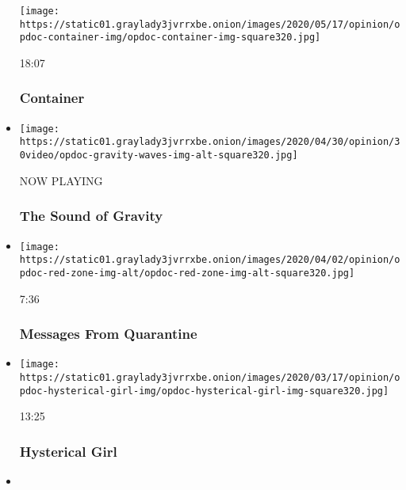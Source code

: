 \begin{itemize}
  \texttt{[image: https://static01.graylady3jvrrxbe.onion/images/2020/05/17/opinion/opdoc-container-img/opdoc-container-img-square320.jpg]}

  18:07

  \hypertarget{container}{%
  \subsubsection{Container}\label{container}}
\item
  \texttt{[image: https://static01.graylady3jvrrxbe.onion/images/2020/04/30/opinion/30video/opdoc-gravity-waves-img-alt-square320.jpg]}

  NOW PLAYING

  \hypertarget{the-sound-of-gravity-2}{%
  \subsubsection{The Sound of Gravity}\label{the-sound-of-gravity-2}}
\item
  \href{https://www.nytimes3xbfgragh.onion/video/opinion/100000007062353/coronavirus-messages-from-quarantine.html?action=click\&module=video-series-bar\&region=header\&pgtype=Article\&playlistId=video/op-docs}{}

  \texttt{[image: https://static01.graylady3jvrrxbe.onion/images/2020/04/02/opinion/opdoc-red-zone-img-alt/opdoc-red-zone-img-alt-square320.jpg]}

  7:36

  \hypertarget{messages-from-quarantine}{%
  \subsubsection{Messages From
  Quarantine}\label{messages-from-quarantine}}
\item
  \href{https://www.nytimes3xbfgragh.onion/video/opinion/100000007026836/hysterical-girl.html?action=click\&module=video-series-bar\&region=header\&pgtype=Article\&playlistId=video/op-docs}{}

  \texttt{[image: https://static01.graylady3jvrrxbe.onion/images/2020/03/17/opinion/opdoc-hysterical-girl-img/opdoc-hysterical-girl-img-square320.jpg]}

  13:25

  \hypertarget{hysterical-girl}{%
  \subsubsection{Hysterical Girl}\label{hysterical-girl}}
\item
  \href{https://www.nytimes3xbfgragh.onion/video/opinion/100000007013675/self-quarantined-for-the-holidays.html?action=click\&module=video-series-bar\&region=header\&pgtype=Article\&playlistId=video/op-docs}{}


\end{itemize}
